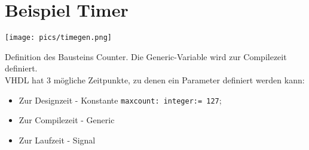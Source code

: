 \section{Beispiel Timer}
\begin{minipage}[]{0.49\textwidth}
\texttt{[image: pics/timegen.png]}

Definition des Bausteins Counter. Die Generic-Variable wird zur Compilezeit definiert.\\
VHDL hat 3 mögliche Zeitpunkte, zu denen ein Parameter definiert werden kann:
\begin{itemize}
\itemsep0em
\item Zur Designzeit - Konstante \texttt{maxcount: integer:= 127};
\item Zur Compilezeit - Generic
\item Zur Laufzeit - Signal
\end{itemize} 


\end{minipage}
\hfill
\begin{minipage}[]{0.49\textwidth}

\end{minipage}